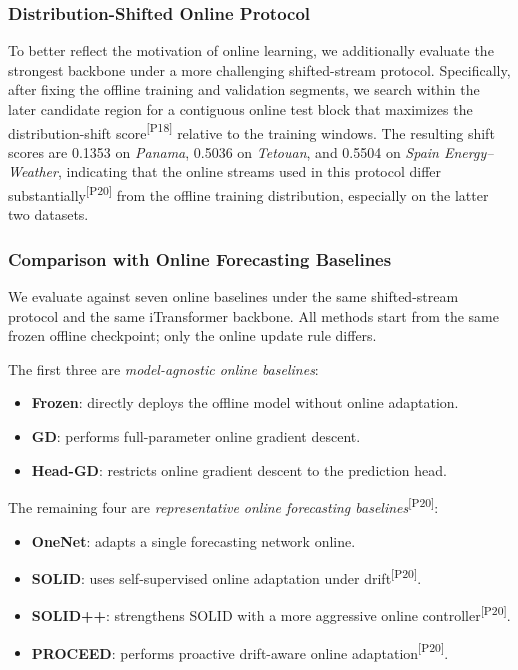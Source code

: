 ﻿\documentclass[journal]{IEEEtran}
\DeclareRobustCommand{\auditbad}[2]{{\color{auditred}#1}{\color{auditred}\textsuperscript{[#2]}}}
\begin{document}
\subsubsection{Distribution-Shifted Online Protocol}
To better reflect the motivation of online learning, we additionally evaluate the strongest backbone under a more challenging shifted-stream protocol. Specifically, after fixing the offline training and validation segments, we \auditbad{search within the later candidate region for a contiguous online test block that maximizes the distribution-shift score}{P18} relative to the training windows. The resulting shift scores are 0.1353 on \textit{Panama}, 0.5036 on \textit{Tetouan}, and 0.5504 on \textit{Spain Energy--Weather}, indicating that the online streams used in this protocol differ \auditbad{substantially}{P20} from the offline training distribution, especially on the latter two datasets.

\subsubsection{Comparison with Online Forecasting Baselines}
We evaluate against seven online baselines under the same shifted-stream protocol and the same iTransformer backbone. All methods start from the same frozen offline checkpoint; only the online update rule differs.

The first three are \emph{model-agnostic online baselines}:
\begin{itemize}
\item \textbf{Frozen}: directly deploys the offline model without online adaptation.
\item \textbf{GD}: performs full-parameter online gradient descent.
\item \textbf{Head-GD}: restricts online gradient descent to the prediction head.
\end{itemize}

The remaining four are \auditbad{\emph{representative online forecasting baselines}}{P20}:
\begin{itemize}
\item \textbf{OneNet}: adapts a single forecasting network online.
\item \textbf{SOLID}: \auditbad{uses self-supervised online adaptation under drift}{P20}.
\item \textbf{SOLID++}: \auditbad{strengthens SOLID with a more aggressive online controller}{P20}.
\item \textbf{PROCEED}: \auditbad{performs proactive drift-aware online adaptation}{P20}.
\end{itemize}
\end{document}
